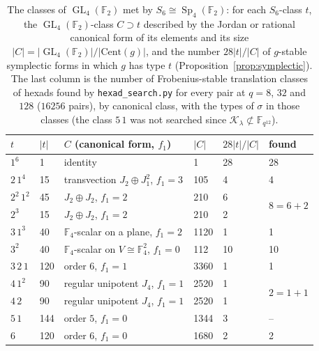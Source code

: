 \documentclass[12pt,a4paper]{amsart}
\theoremstyle{definition}
\newcommand{\F}{\mathbb{F}}
\newcommand{\Sp}{\operatorname{Sp}}
\newcommand{\GL}{\operatorname{GL}}
\newcommand{\Kk}{\mathcal{K}}
\begin{document}
\begin{table}[H]
\centering
\caption{The classes of $\GL_4(\F_2)$ met by $S_6\cong\Sp_4(\F_2)$: for each $S_6$-class $t$, the $\GL_4(\F_2)$-class $C\supset t$ described by the Jordan or rational canonical form of its elements and its size $|C|=|\GL_4(\F_2)|/|\mathrm{Cent}(g)|$, and the number $28|t|/|C|$ of $g$-stable symplectic forms in which $g$ has type $t$ (Proposition~\ref{prop:symplectic}). The last column is the number of Frobenius-stable translation classes of hexads found by \texttt{hexad\_search.py} for every pair at $q=8$, $32$ and $128$ ($16256$ pairs), by canonical class, with the types of $\sigma$ in those classes (the class $5\,1$ was not searched since $\Kk_\lambda\not\subset\F_{q^{12}}$).}\label{tab:symplectic}
\small
\begin{tabular}{@{}llllll@{}}
\toprule
$t$ & $|t|$ & $C$ (canonical form, $f_1$) & $|C|$ & $28|t|/|C|$ & found\\
\midrule
$1^6$ & 1 & identity & 1 & 28 & 28\\
$2\,1^4$ & 15 & transvection $J_2\oplus J_1^2$, $f_1=3$ & 105 & 4 & 4\\
$2^2\,1^2$ & 45 & $J_2\oplus J_2$, $f_1=2$ & 210 & 6 & \multirow{2}{*}{$8=6+2$}\\
$2^3$ & 15 & $J_2\oplus J_2$, $f_1=2$ & 210 & 2 & \\
$3\,1^3$ & 40 & $\F_4$-scalar on a plane, $f_1=2$ & 1120 & 1 & 1\\
$3^2$ & 40 & $\F_4$-scalar on $V\cong\F_4^2$, $f_1=0$ & 112 & 10 & 10\\
$3\,2\,1$ & 120 & order $6$, $f_1=1$ & 3360 & 1 & 1\\
$4\,1^2$ & 90 & regular unipotent $J_4$, $f_1=1$ & 2520 & 1 & \multirow{2}{*}{$2=1+1$}\\
$4\,2$ & 90 & regular unipotent $J_4$, $f_1=1$ & 2520 & 1 & \\
$5\,1$ & 144 & order $5$, $f_1=0$ & 1344 & 3 & --\\
$6$ & 120 & order $6$, $f_1=0$ & 1680 & 2 & 2\\
\bottomrule
\end{tabular}
\end{table}
\end{document}
